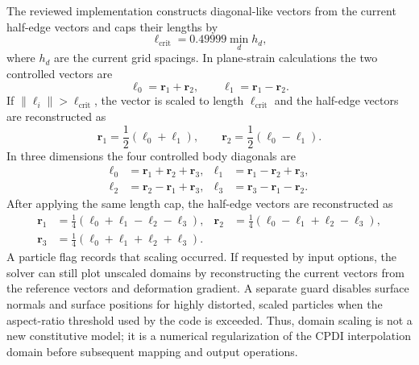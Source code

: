The reviewed implementation constructs diagonal-like vectors from the current half-edge vectors and caps their lengths by
\begin{equation}
  \ell_{\mathrm{crit}} = 0.49999\min_d h_d,
  \label{eq:cpdi-domain-scale-lcrit}
\end{equation}
where $h_d$ are the current grid spacings.  In plane-strain calculations the two controlled vectors are
\begin{equation}
  \boldsymbol{\ell}_0=\boldsymbol{r}_1+\boldsymbol{r}_2,
  \qquad
  \boldsymbol{\ell}_1=\boldsymbol{r}_1-\boldsymbol{r}_2.
  \label{eq:cpdi-scaling-2d-lvectors}
\end{equation}
If $\|\boldsymbol{\ell}_i\|>\ell_{\mathrm{crit}}$, the vector is scaled to length $\ell_{\mathrm{crit}}$ and the half-edge vectors are reconstructed as
\begin{equation}
  \boldsymbol{r}_1=\frac{1}{2}(\boldsymbol{\ell}_0+\boldsymbol{\ell}_1),
  \qquad
  \boldsymbol{r}_2=\frac{1}{2}(\boldsymbol{\ell}_0-\boldsymbol{\ell}_1).
  \label{eq:cpdi-scaling-2d-reconstruct}
\end{equation}
In three dimensions the four controlled body diagonals are
\begin{align}
  \boldsymbol{\ell}_0&=\boldsymbol{r}_1+\boldsymbol{r}_2+\boldsymbol{r}_3,
  &
  \boldsymbol{\ell}_1&=\boldsymbol{r}_1-\boldsymbol{r}_2+\boldsymbol{r}_3,
  \label{eq:cpdi-scaling-3d-lvectors-a}\\
  \boldsymbol{\ell}_2&=\boldsymbol{r}_2-\boldsymbol{r}_1+\boldsymbol{r}_3,
  &
  \boldsymbol{\ell}_3&=\boldsymbol{r}_3-\boldsymbol{r}_1-\boldsymbol{r}_2.
  \label{eq:cpdi-scaling-3d-lvectors-b}
\end{align}
After applying the same length cap, the half-edge vectors are reconstructed as
\begin{align}
  \boldsymbol{r}_1&=\frac{1}{4}(\boldsymbol{\ell}_0+\boldsymbol{\ell}_1-\boldsymbol{\ell}_2-\boldsymbol{\ell}_3),
  &
  \boldsymbol{r}_2&=\frac{1}{4}(\boldsymbol{\ell}_0-\boldsymbol{\ell}_1+\boldsymbol{\ell}_2-\boldsymbol{\ell}_3),
  \label{eq:cpdi-scaling-3d-reconstruct-a}\\
  \boldsymbol{r}_3&=\frac{1}{4}(\boldsymbol{\ell}_0+\boldsymbol{\ell}_1+\boldsymbol{\ell}_2+\boldsymbol{\ell}_3).
  \label{eq:cpdi-scaling-3d-reconstruct-b}
\end{align}
A particle flag records that scaling occurred.  If requested by input options, the solver can still plot unscaled domains by reconstructing the current vectors from the reference vectors and deformation gradient.  A separate guard disables surface normals and surface positions for highly distorted, scaled particles when the aspect-ratio threshold used by the code is exceeded.  Thus, domain scaling is not a new constitutive model; it is a numerical regularization of the CPDI interpolation domain before subsequent mapping and output operations.


